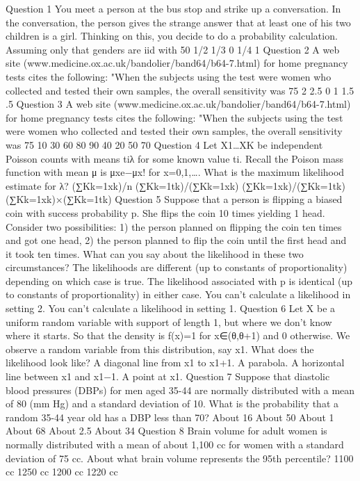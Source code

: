 Question 1
You meet a person at the bus stop and strike up a conversation. In the conversation, the person gives the strange answer that at least one of his two children is a girl. Thinking on this, you decide to do a probability calculation. Assuming only that genders are iid with 50%
1/2
1/3
0
1/4
1
Question 2
A web site (www.medicine.ox.ac.uk/bandolier/band64/b64-7.html) for home pregnancy tests cites the following: "When the subjects using the test were women who collected and tested their own samples, the overall sensitivity was 75%
2
2.5
0
1
1.5
.5
Question 3
A web site (www.medicine.ox.ac.uk/bandolier/band64/b64-7.html) for home pregnancy tests cites the following: "When the subjects using the test were women who collected and tested their own samples, the overall sensitivity was 75%
10%
30%
60%
80%
90%
40%
20%
50%
70%
Question 4
Let X1…XK be independent Poisson counts with means tiλ for some known value ti. Recall the Poison mass function with mean μ is μxe−μx! for x=0,1,…. What is the maximum likelihood estimate for λ?
(∑Kk=1xk)/n
(∑Kk=1tk)/(∑Kk=1xk)
(∑Kk=1xk)/(∑Kk=1tk)
(∑Kk=1xk)×(∑Kk=1tk)
Question 5
Suppose that a person is flipping a biased coin with success probability p. She flips the coin 10 times yielding 1 head. Consider two possibilities: 1) the person planned on flipping the coin ten times and got one head, 2) the person planned to flip the coin until the first head and it took ten times. What can you say about the likelihood in these two circumstances?
The likelihoods are different (up to constants of proportionality) depending on which case is true.
The likelihood associated with p is identical (up to constants of proportionality) in either case.
You can't calculate a likelihood in setting 2.
You can't calculate a likelihood in setting 1.
Question 6
Let X be a uniform random variable with support of length 1, but where we don't know where it starts. So that the density is f(x)=1 for x∈(θ,θ+1) and 0 otherwise. We observe a random variable from this distribution, say x1. What does the likelihood look like?
A diagonal line from x1 to x1+1.
A parabola.
A horizontal line between x1 and x1−1.
A point at x1.
Question 7
Suppose that diastolic blood pressures (DBPs) for men aged 35-44 are normally distributed with a mean of 80 (mm Hg) and a standard deviation of 10. What is the probability that a random 35-44 year old has a DBP less than 70?
About 16%
About 50%
About 1%
About 68%
About 2.5%
About 34%
Question 8
Brain volume for adult women is normally distributed with a mean of about 1,100 cc for women with a standard deviation of 75 cc. About what brain volume represents the 95th percentile?
1100 cc
1250 cc
1200 cc
1220 cc
